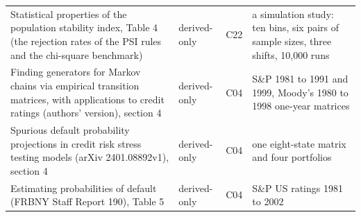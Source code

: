 {\begin{longtable}{>{\raggedright\arraybackslash}p{6.4cm}>{\raggedright\arraybackslash}p{2.2cm}>{\raggedright\arraybackslash}p{2.8cm}>{\raggedright\arraybackslash}p{3.0cm}}
Statistical properties of the population stability index, Table 4 (the rejection rates of the PSI rules and the chi-square benchmark) & derived-only & C22 & a simulation study: ten bins, six pairs of sample sizes, three shifts, 10,000 runs \\
Finding generators for Markov chains via empirical transition matrices, with applications to credit ratings (authors' version), section 4 & derived-only & C04 & S\&P 1981 to 1991 and 1999, Moody's 1980 to 1998 one-year matrices \\
Spurious default probability projections in credit risk stress testing models (arXiv 2401.08892v1), section 4 & derived-only & C04 & one eight-state matrix and four portfolios \\
Estimating probabilities of default (FRBNY Staff Report 190), Table 5 & derived-only & C04 & S\&P US ratings 1981 to 2002 \\
\end{longtable}
}
